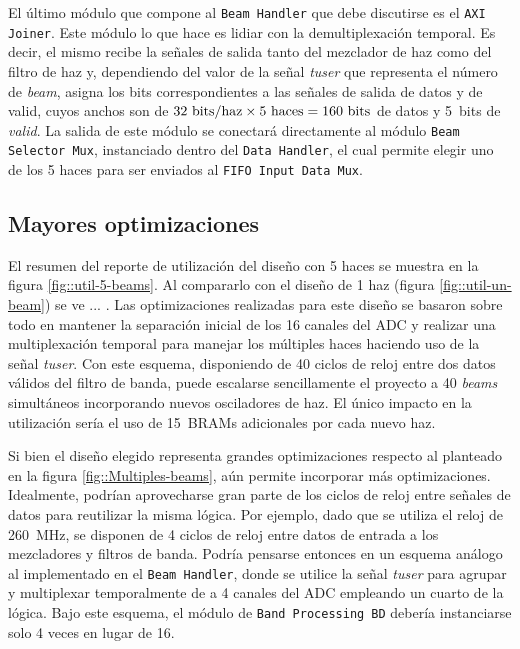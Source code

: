 \documentclass[../../main.tex]{subfiles}
\begin{document}
El último módulo que compone al \texttt{Beam Handler} que debe discutirse es el \texttt{AXI Joiner}. Este módulo lo que hace es lidiar con la demultiplexación temporal. Es decir, el mismo recibe la señales de salida tanto del mezclador de haz como del filtro de haz y, dependiendo del valor de la señal \textit{tuser} que representa el número de \textit{beam}, asigna los bits correspondientes a las señales de salida de datos y de valid, cuyos anchos son de $32~\textrm{bits/haz} \times 5~\textrm{haces} = 160~\textrm{bits}$ de datos y 5~bits de \textit{valid}. La salida de este módulo se conectará directamente al módulo \texttt{Beam Selector Mux}, instanciado dentro del \texttt{Data Handler}, el cual permite elegir uno de los 5 haces para ser enviados al \texttt{FIFO Input Data Mux}.


\subsection{Mayores optimizaciones}
El resumen del reporte de utilización del diseño con 5 haces se muestra en la figura \ref{fig::util-5-beams}. Al compararlo con el diseño de 1 haz (figura \ref{fig::util-un-beam}) se ve ... .
Las optimizaciones realizadas para este diseño se basaron sobre todo en mantener la separación inicial de los 16 canales del ADC y realizar una multiplexación temporal para manejar los múltiples haces haciendo uso de la señal \textit{tuser}. Con este esquema, disponiendo de 40 ciclos de reloj entre dos datos válidos del filtro de banda, puede escalarse sencillamente el proyecto a 40 \textit{beams} simultáneos incorporando nuevos osciladores de haz. El único impacto en la utilización sería el uso de 15~BRAMs adicionales por cada nuevo haz.

Si bien el diseño elegido representa grandes optimizaciones respecto al planteado en la figura \ref{fig::Multiples-beams}, aún permite incorporar más optimizaciones. Idealmente, podrían aprovecharse gran parte de los ciclos de reloj entre señales de datos para reutilizar la misma lógica. Por ejemplo, dado que se utiliza el reloj de 260~MHz, se disponen de 4 ciclos de reloj entre datos de entrada a los mezcladores y filtros de banda. Podría pensarse entonces en un esquema análogo al implementado en el \texttt{Beam Handler}, donde se utilice la señal \textit{tuser} para agrupar y multiplexar temporalmente de a 4 canales del ADC empleando un cuarto de la lógica. Bajo este esquema, el módulo de \texttt{Band Processing BD} debería instanciarse solo 4 veces en lugar de 16.
\end{document}
